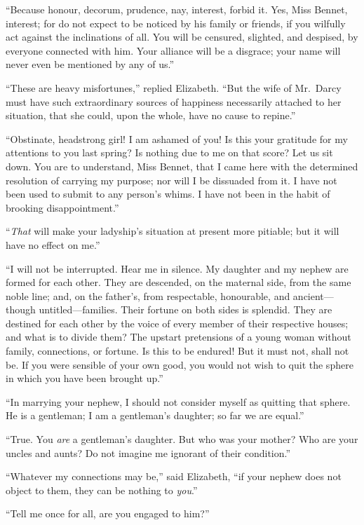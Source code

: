 ``Because honour, decorum, prudence, nay, interest, forbid it.
Yes, Miss Bennet, interest; for do not expect to be noticed
by his family or friends, if you wilfully act against the
inclinations of all.  You will be censured, slighted, and
despised, by everyone connected with him.  Your alliance will
be a disgrace; your name will never even be mentioned by any
of us.''

``These are heavy misfortunes,'' replied Elizabeth.  ``But the
wife of Mr.\ Darcy must have such extraordinary sources of
happiness necessarily attached to her situation, that she
could, upon the whole, have no cause to repine.''

``Obstinate, headstrong girl!  I am ashamed of you!  Is this
your gratitude for my attentions to you last spring?  Is
nothing due to me on that score?  Let us sit down.  You are to
understand, Miss Bennet, that I came here with the determined
resolution of carrying my purpose; nor will I be dissuaded
from it.  I have not been used to submit to any person's whims.
I have not been in the habit of brooking disappointment.''

``\emph{That} will make your ladyship's situation at present more
pitiable; but it will have no effect on me.''

``I will not be interrupted.  Hear me in silence.  My daughter
and my nephew are formed for each other.  They are descended,
on the maternal side, from the same noble line; and, on the
father's, from respectable, honourable, and ancient---though
untitled---families.  Their fortune on both sides is splendid.
They are destined for each other by the voice of every member
of their respective houses; and what is to divide them?
The upstart pretensions of a young woman without family,
connections, or fortune.  Is this to be endured!  But it
must not, shall not be.  If you were sensible of your own
good, you would not wish to quit the sphere in which you
have been brought up.''

``In marrying your nephew, I should not consider myself as
quitting that sphere.  He is a gentleman; I am a gentleman's
daughter; so far we are equal.''

``True.  You \emph{are} a gentleman's daughter.  But who was your
mother?  Who are your uncles and aunts?  Do not imagine me
ignorant of their condition.''

``Whatever my connections may be,'' said Elizabeth, ``if your
nephew does not object to them, they can be nothing to \emph{you}.''

``Tell me once for all, are you engaged to him?''

